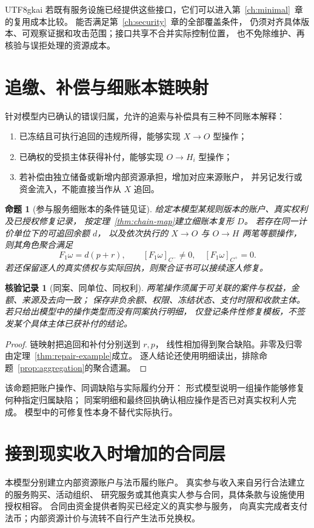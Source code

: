 \documentclass[12pt,a4paper,openany]{report}
\newtheorem{proposition}{命题}[chapter]
\newtheorem{Certificate}{核验记录}[chapter]
\begin{document}
\begin{CJK*}{UTF8}{gkai}
若既有服务设施已经提供这些接口，它们可以进入第~\ref{ch:minimal}~章的复用成本比较。
能否满足第~\ref{ch:security}~章的全部覆盖条件，
仍须对齐具体版本、可观察证据和攻击范围；接口共享不合并实际控制位置，
也不免除维护、再核验与误拒处理的资源成本。

\section{追缴、补偿与细账本链映射}
针对模型内已确认的错误归属，允许的追索与补偿具有三种不同账本解释：
\begin{enumerate}[label=(\arabic*)]
\item 已冻结且可执行追回的违规所得，能够实现 \(X\to O\) 型操作；
\item 已确权的受损主体获得补付，能够实现 \(O\to H_i\) 型操作；
\item 若补偿由独立储备或新增内部资源承担，增加对应来源账户，
并另记发行或资金流入，不能直接当作从 \(X\) 追回。
\end{enumerate}

\begin{proposition}[参与服务细账本的条件链见证]
\label{prop:service-chain}
给定本模型某规则版本的账户、真实权利及已授权修复记录，
按定理~\ref{thm:chain-map}建立细账本复形 \(D\)。
若存在同一计价单位下的可追回余额 \(d\)，
以及依次执行的 \(X\to O\) 与 \(O\to H\) 两笔等额操作，
则其角色聚合满足
\[
F_1\omega=d(p+r),\qquad
[F_1\omega]_{C^-}\ne0,\quad
[F_1\omega]_{C^+}=0.
\]
若还保留逐人的真实债权与实际回执，则聚合证书可以接续逐人修复。
\end{proposition}
\begin{Certificate}[同案、同单位、同权利]
两笔操作须属于可关联的案件与权益，金额、来源及去向一致；
保存非负余额、权限、冻结状态、支付时限和收款主体。
若只给出模型中的操作类型而没有同案执行明细，
仅登记条件性修复模板，不签发某个具体主体已获补付的结论。
\end{Certificate}
\begin{proof}
链映射把追回和补付分别送到 \(r,p\)，
线性相加得到聚合缺陷。非零及归零由定理~\ref{thm:repair-example}成立。
逐人结论还使用明细读出，排除命题~\ref{prop:aggregation}的聚合遗漏。
\end{proof}

该命题把账户操作、同调缺陷与实际履约分开：
形式模型说明一组操作能够修复何种指定归属缺陷；
同案明细和最终回执确认相应操作是否已对真实权利人完成。
模型中的可修复性本身不替代实际执行。

\section{接到现实收入时增加的合同层}
本模型分别建立内部资源账户与法币履约账户。
真实参与收入来自另行合法建立的服务购买、活动组织、
研究服务或其他真实人参与合同，具体条款与设施使用授权相容。
合同由资金提供者购买已经定义的真实参与服务，
向真实完成者支付法币；内部资源计价与流转不自行产生法币兑换权。


\end{CJK*}
\end{document}
